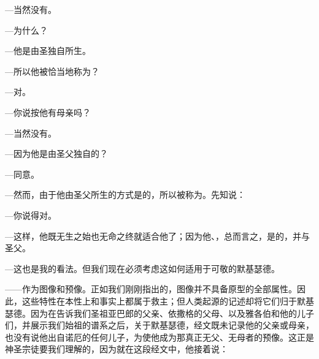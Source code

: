 —当然没有。\par

—为什么？\par

—他是由圣独自所生。\par

—所以他被恰当地称为？\par

—对。\par

—你说按他有母亲吗？\par

—当然没有。\par

—因为他是由圣父独自的？\par

—同意。\par

—然而，由于他由圣父所生的方式是的，所以被称为。先知说：\par

—你说得对。\par

—这样，他既无生之始也无命之终就适合他了；因为他、，总而言之，是的，并与圣父。\par

—这也是我的看法。但我们现在必须考虑这如何适用于可敬的默基瑟德。\par

——作为图像和预像。正如我们刚刚指出的，图像并不具备原型的全部属性。因此，这些特性在本性上和事实上都属于救主；但人类起源的记述却将它们归于默基瑟德。因为在告诉我们圣祖亚巴郎的父亲、依撒格的父母、以及雅各伯和他的儿子们，并展示我们始祖的谱系之后，关于默基瑟德，经文既未记录他的父亲或母亲，也没有说他出自诺厄的任何儿子，为使他成为那真正无父、无母者的预像。这正是神圣宗徒要我们理解的，因为就在这段经文中，他接着说：\par

